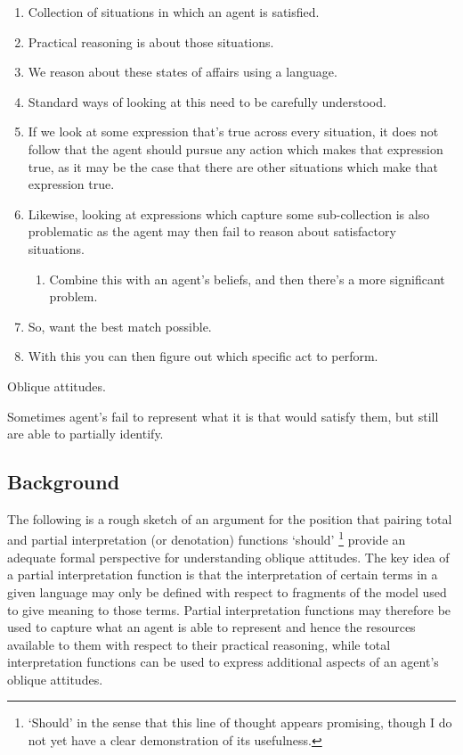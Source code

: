\documentclass[10pt]{article}
\begin{document}



\begin{enumerate}
\item Collection of situations in which an agent is satisfied.
\item Practical reasoning is about those situations.
\item We reason about these states of affairs using a language.
\item Standard ways of looking at this need to be carefully understood.
\item If we look at some expression that's true across every situation, it does not follow that the agent should pursue any action which makes that expression true, as it may be the case that there are other situations which make that expression true.
\item Likewise, looking at expressions which capture some sub-collection is also problematic as the agent may then fail to reason about satisfactory situations.
  \begin{enumerate}
  \item Combine this with an agent's beliefs, and then there's a more significant problem.
  \end{enumerate}
\item So, want the best match possible.
\item With this you can then figure out which specific act to perform.
\end{enumerate}

Oblique attitudes.

Sometimes agent's fail to represent what it is that would satisfy them, but still are able to partially identify.





\subsection{Background}
\label{sec:background}

The following is a rough sketch of an argument for the position that pairing total and partial interpretation (or denotation) functions `should'\nolinebreak
\footnote{`Should' in the sense that this line of thought appears promising, though I do not yet have a clear demonstration of its usefulness.}
provide an adequate formal perspective for understanding oblique attitudes.
The key idea of a partial interpretation function is that the interpretation of certain terms in a given language may only be defined with respect to fragments of the model used to give meaning to those terms.
Partial interpretation functions may therefore be used to capture what an agent is able to represent and hence the resources available to them with respect to their practical reasoning, while total interpretation functions can be used to express additional aspects of an agent's oblique attitudes.
\end{document}
